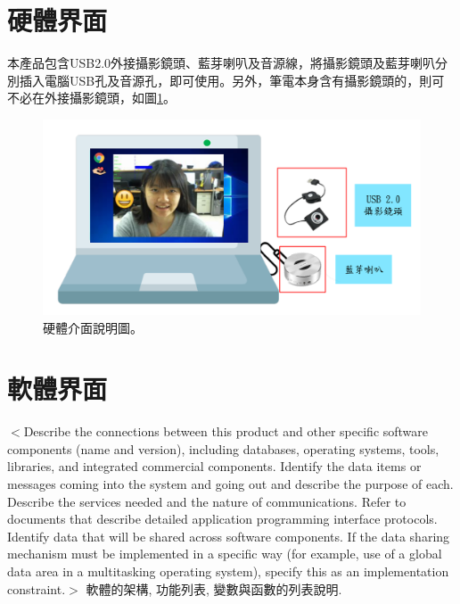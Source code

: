 \documentclass[12pt]{scrreprt}
\begin{document}
\section{硬體界面}
本產品包含USB2.0外接攝影鏡頭、藍芽喇叭及音源線，將攝影鏡頭及藍芽喇叭分別插入電腦USB孔及音源孔，即可使用。另外，筆電本身含有攝影鏡頭的，則可不必在外接攝影鏡頭，如圖\ref{fig:hardInterface}。
\begin{figure}[!h]
\begin{center}
\includegraphics[width=1\textwidth]{./figs/hardware.pdf}
\end{center}
\caption{硬體介面說明圖。}
\label{fig:hardInterface}
\end{figure}

\section{軟體界面}
$<$Describe the connections between this product and other specific software 
components (name and version), including databases, operating systems, tools, 
libraries, and integrated commercial components. Identify the data items or 
messages coming into the system and going out and describe the purpose of each.  
Describe the services needed and the nature of communications. Refer to 
documents that describe detailed application programming interface protocols.  
Identify data that will be shared across software components. If the data 
sharing mechanism must be implemented in a specific way (for example, use of a 
global data area in a multitasking operating system), specify this as an 
implementation constraint.$>$
軟體的架構, 功能列表, 變數與函數的列表說明.
\end{document}
